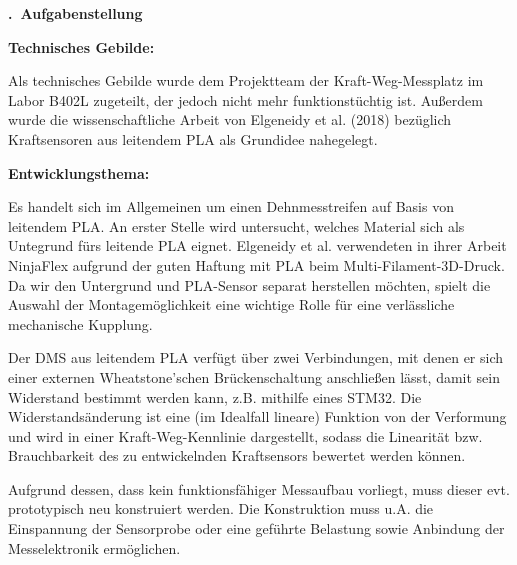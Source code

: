 \documentclass[11pt,a4paper]{article}
\newcounter{feldnr}
\newcommand{\formfeld}[1]{%
  \par\medskip\Needspace{6\baselineskip}\noindent
  \stepcounter{feldnr}%
  \colorbox{bhtgrau}{\parbox{\dimexpr\linewidth-2\fboxsep}{\textbf{\thefeldnr.\ #1}}}%
  \par\smallskip}
\begin{document}
\smallskip

\formfeld{Aufgabenstellung}
\textbf{Technisches Gebilde:} \vspace{0.5em}

Als technisches Gebilde wurde dem Projektteam der Kraft-Weg-Messplatz im Labor B402L zugeteilt, der jedoch nicht mehr funktionstüchtig ist. 
Außerdem wurde die wissenschaftliche Arbeit von Elgeneidy et al. (2018) bezüglich Kraftsensoren aus leitendem PLA als Grundidee nahegelegt. 

\medskip
\textbf{Entwicklungsthema:} \vspace{0.5em}

Es handelt sich im Allgemeinen um einen Dehnmesstreifen auf Basis von leitendem PLA. An erster Stelle wird untersucht, welches Material
sich als Untegrund fürs leitende PLA eignet. Elgeneidy et al. verwendeten in ihrer Arbeit NinjaFlex aufgrund der guten Haftung mit PLA
beim Multi-Filament-3D-Druck. Da wir den Untergrund und PLA-Sensor separat herstellen möchten, spielt die Auswahl 
der Montagemöglichkeit eine wichtige Rolle für eine verlässliche mechanische Kupplung. \vspace{0.5em}

Der DMS aus leitendem PLA verfügt über zwei Verbindungen, mit denen er sich einer externen Wheatstone'schen Brückenschaltung
anschließen lässt, damit sein Widerstand bestimmt werden kann, z.B. mithilfe eines STM32. 
Die Widerstandsänderung ist eine (im Idealfall lineare) Funktion von der Verformung und wird in einer Kraft-Weg-Kennlinie 
dargestellt, sodass die Linearität bzw. Brauchbarkeit des zu entwickelnden Kraftsensors bewertet werden können. \vspace{0.5em}

Aufgrund dessen, dass kein funktionsfähiger Messaufbau vorliegt, muss dieser evt. prototypisch neu konstruiert werden. 
Die Konstruktion muss u.A. die Einspannung der Sensorprobe oder eine geführte Belastung sowie 
Anbindung der Messelektronik ermöglichen.
\end{document}
